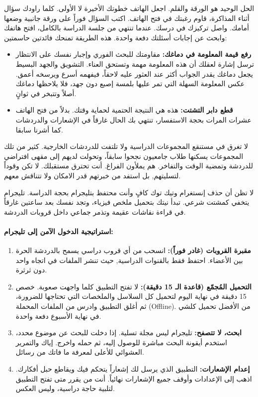 \documentclass[12pt,a4paper]{book}
\begin{document}
الحل الوحيد هو الورقة والقلم. اجعل الهاتف خطوتك الأخيرة لا الأولى. كلما راودك سؤال أثناء المذاكرة، قاوم رغبتك في فتح الهاتف. اكتب السؤال فوراً على ورقة جانبية وضعها أمامك. واصل تركيزك في درسك. عندما تنتهي من جلسة الدراسة بالكامل، افتح هاتفك وابحث عن إجابات أسئلتك دفعة واحدة. هذه الطريقة تمنحك فائدتين حاسمتين:

\begin{itemize}
	\item \textbf{رفع قيمة المعلومة في دماغك:} مقاومتك للبحث الفوري وإجبار نفسك على الانتظار ترسل إشارة لعقلك أن هذه المعلومة مهمة وتستحق العناء. التشويق والجهد البسيط يجعل دماغك يقدر الجواب أكثر عند العثور عليه لاحقاً، فيفهمه أسرع ويرسخه أعمق. عكس المعلومة السهلة التي تمر عليها بلمسة إصبع دون جهد، فلا يلاحظها دماغك أصلاً وتتبخر في ثوانٍ.
	
	\item \textbf{قطع دابر التشتت:} هذه هي النتيجة الحتمية لحماية وقتك. بدلاً من فتح الهاتف عشرات المرات بحجة الاستفسار، تنتهي بك الحال غارقاً في الإشعارات والدردشات كما أشرنا سابقا.
\end{itemize}

لا تغرق في مستنقع المجموعات الدراسية ولا تلتفت للدردشات الخارجية. كثير من تلك المجموعات يسكنها طلاب جامعيون نجحوا سابقاً، وتحولت لديهم إلى مقهى افتراضي للدردشة وتمضية الوقت والتفاخر. هم يملأون الفراغ. أنت تحترق مستقبلك. لا تكن وقوداً لتسليتهم, بل استفد من خبرتهم قدر الامكان ولا تتناقش معهم.

لا تظن أن حذف إنستغرام وتيك توك كافٍ وأنت محتفظ بتليجرام بحجة الدراسة. تليجرام يتخفي كمشتت شرعي. تبدأ نيتك بتحميل ملخص فيزياء، وتجد نفسك بعد ساعتين غارقاً في قراءة نقاشات عقيمة وتذمر جماعي داخل قروبات الدردشة.

\paragraph{استراتيجية الدخول الآمن إلى تليجرام:}

\begin{enumerate}
	\item \textbf{مقبرة القروبات (غادر فوراً):} انسحب من أي قروب دراسي يسمح بالدردشة الحرة بين الأعضاء. احتفظ فقط بالقنوات الدراسية, حيث تنشر الملفات في اتجاه واحد دون ثرثرة.
	
	\item \textbf{التحميل المُجمّع (قاعدة الـ 15 دقيقة):} لا تفتح التطبيق كلما واجهت صعوبة. خصص 15 دقيقة في نهاية اليوم لتحميل كل السلاسل والملخصات التي تحتاجها للضرورة، ثم أغلق التطبيق وادرس من الملفات المحملة (Offline). من الأفضل تحميل كلشي في نهاية الأسبوع دفعة واحدة.
	
	\item \textbf{ابحث، لا تتصفح:} تليجرام ليس مجلة تسلية. إذا دخلت للبحث عن موضوع محدد، استخدم أيقونة البحث مباشرة للوصول إليه، ثم حمله واخرج. إياك والتمرير العشوائي للأعلى لمعرفة ما فاتك من رسائل.
	
	\item \textbf{إعدام الإشعارات:} التطبيق الذي يرسل لك إشعاراً يتحكم فيك ويقاطع حبل أفكارك. اذهب إلى الإعدادات وأوقف جميع الإشعارات نهائياً. أنت من يقرر متى تفتح التطبيق لتلبية حاجة دراسية، وليس العكس.
\end{enumerate}
\end{document}
